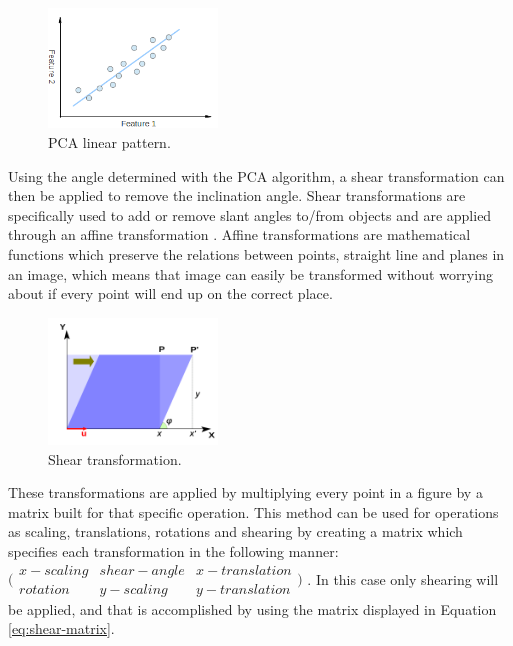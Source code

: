 \begin{figure}[ht]
    \centering
    \includegraphics[width=0.4\textwidth]{plaatjes/pca_line}
    \caption{PCA linear pattern. \cite{pca-line-fig}}
    \label{fig:pca-line}
\end{figure}%

Using the angle determined with the PCA algorithm, a shear transformation can then be applied to remove the inclination angle. Shear transformations are specifically used to add or remove slant angles to/from objects and are applied through an affine transformation \cite{berger1987geometry}. Affine transformations are mathematical functions which preserve the relations between points, straight line and planes in an image, which means that image can easily be transformed without worrying about if every point will end up on the correct place.


\begin{figure}[ht]
    \centering
    \includegraphics[width=0.4\textwidth]{plaatjes/shear}
    \caption{Shear transformation. \cite{shear-fig}}
    \label{fig:shear}
\end{figure}%

These transformations are applied by multiplying every point in a figure by a matrix built for that specific operation. This method can be used for operations as scaling, translations, rotations and shearing by creating a matrix which specifies each transformation in the following manner: 
$\bigl(
    \begin{smallmatrix}
        x-scaling & shear-angle & x-translation \\ 
        rotation & y-scaling & y-translation
    \end{smallmatrix} 
\bigr)$
. In this case only shearing will be applied, and that is accomplished by using the matrix displayed in Equation \ref{eq:shear-matrix}. 

